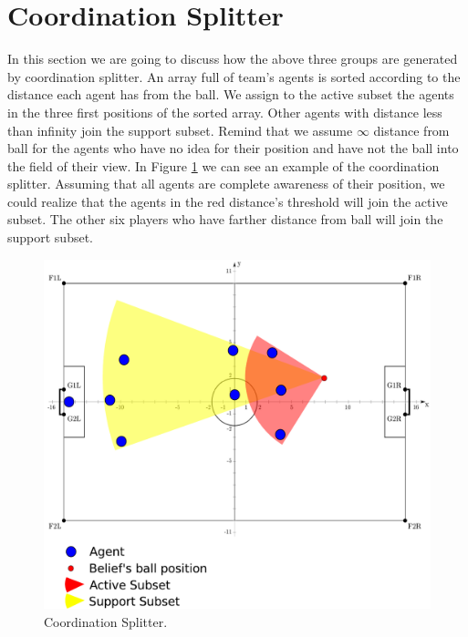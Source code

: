\section{Coordination Splitter}
In this section we are going to discuss how the above three groups are generated by coordination splitter. An array full of team's agents is sorted according to the distance each agent has from the ball. We assign to the active subset the agents in the three first positions of the sorted array.
Other agents with distance less than infinity join the support subset.
Remind that we assume $\infty$ distance from ball for the agents who have no idea for their position and have not the ball into the field of their view.
In Figure \ref{fig:Splitter} we can see an example of the coordination splitter. Assuming that all agents are complete awareness of their position, we could realize that the agents in the red distance's threshold will join the active subset. The other six players who have farther distance from ball will join the support subset.
\begin{figure}[htb!]
\centering
  \includegraphics[width=\textwidth]{Chapter4/figures/Splitter.pdf}
  \caption{Coordination Splitter.} 
  \label{fig:Splitter}
\end{figure}


